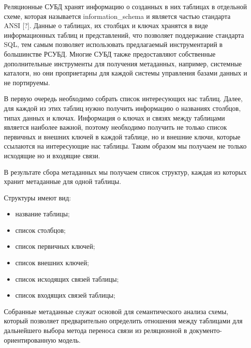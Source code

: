 Реляционные СУБД хранят информацию о созданных в них таблицах в отдельной схеме, 
которая называется information\_schema и является частью стандарта ANSI [?].
Данные о таблицах, их столбцах и ключах хранятся в виде информационных таблиц и представлений, 
что позволяет поддержание стандарта SQL, тем самым позволяет использовать предлагаемый инструментарий в большинстве РСУБД.
Многие СУБД также предоставляют собственные дополнительные инструменты для получения метаданных, например, системные каталоги,
но они проприетарны для каждой системы управления базами данных и не портируемы.

В первую очередь необходимо собрать список интересующих нас таблиц.
Далее, для каждой из этих таблиц нужно получить информацию о названиях столбцов, типах данных и ключах.
Информация о ключах и связях между таблицами является наиболее важной, 
поэтому необходимо получить не только список первичных и внешних ключей в каждой таблице, но и внешние ключи, 
которые ссылаются на интересующие нас таблицы.
Таким образом мы получаем не только исходящие но и входящие связи.

В результате сбора метаданных мы получаем список структур, каждая из которых хранит метаданные для одной таблицы.

\noindent Структуры имеют вид:
\begin{itemize}[label=---]
    \item название таблицы;
    \item список столбцов; 

    \item список первичных ключей;
    \item список внешних ключей;
    \item список исходящих связей таблицы;
    \item список входящих связей таблицы;
\end{itemize}

Собранные метаданные служат основой для семантического анализа схемы, 
который позволяет предварительно определить отношения между таблицами для 
дальнейшего выбора метода переноса связи из реляционной в документо-ориентированную модель.

